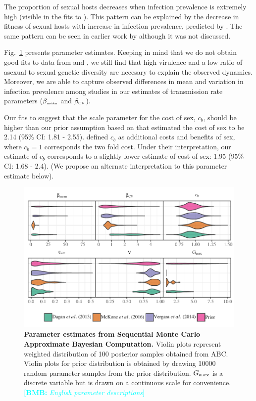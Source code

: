 \documentclass{article}\usepackage[]{graphicx}\usepackage[]{color}
\newcommand{\comment}[3]{\textcolor{#1}{\textbf{[#2: }\textit{#3}\textbf{]}}}
\newcommand{\bmb}[1]{\comment{cyan}{BMB}{#1}}
\newcommand{\fref}[1]{Fig.~\ref{fig:#1}}
\begin{document}
The proportion of sexual hosts decreases when infection prevalence is extremely high (visible in the fits to \cite{vergara2014infection}).
This pattern can be explained by the decrease in fitness of sexual hosts with increase in infection prevalence, predicted by \cite{ashby2015diversity}. 
The same pattern can be seen in earlier work by \cite{lively2010epidemiological} although it was not discussed.

\fref{smcparam} presents parameter estimates.
Keeping in mind that we do not obtain good fits to data from \cite{dagan2013clonal} and \cite{mckone2016fine}, we still find that high virulence and a low ratio of asexual to sexual genetic diversity are necesary to explain the observed dynamics.
Moreover, we are able to capture observed differences in mean and variation in infection prevalence among studies in our estimates of transmission rate parameters ($\beta_{\textrm{\tiny mean}}$ and $\beta_{\textrm{\tiny CV}}$).

Our fits to \cite{mckone2016fine} suggest that the scale parameter for the cost of sex, $c_b$, should be higher than our prior assumption based on \cite{gibson2017two} that estimated the cost of sex to be 2.14 (95\% CI: 1.81 - 2.55).
\cite{ashby2015diversity} defined $c_b$ as additional costs and benefits of sex, where $c_b=1$ corresponds the two fold cost.
Under their interpretation, our estimate of $c_b$ corresponds to a slightly lower estimate of cost of sex: 1.95 (95\% CI: 1.68 - 2.4). 
(We propose an alternate interpretation to this parameter estimate below).

\begin{figure}[!ht]
\includegraphics[width=\textwidth]{../fig/posterior.pdf}
\caption{{\bf Parameter estimates from Sequential Monte Carlo Approximate Bayesian Computation.}
Violin plots represent weighted distribution of 100 posterior samples obtained from ABC.
Violin plots for prior distribution is obtained by drawing 10000 random parameter samples from the prior distribution.
$G_{\tiny \textrm{asex}}$ is a discrete variable but is drawn on a continuous scale for convenience.
\bmb{English parameter descriptions}
}
\label{fig:smcparam}
\end{figure}
\end{document}
